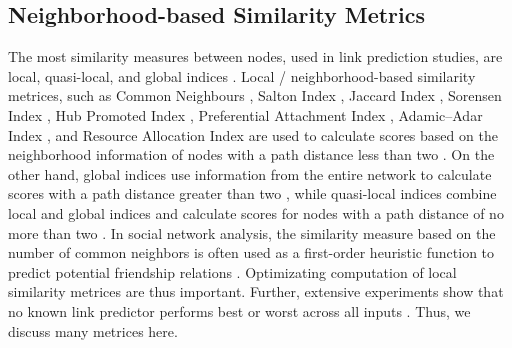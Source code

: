 



\subsection{Neighborhood-based Similarity Metrics}

The most similarity measures between nodes, used in link prediction studies, are local, quasi-local, and global indices \cite{arrar2023comprehensive}. Local / neighborhood-based similarity metrices, such as Common Neighbours \cite{newman2001clustering}, Salton Index \cite{salton1973specification}, Jaccard Index \cite{jaccard1901etude}, Sorensen Index \cite{sorensen1948method}, Hub Promoted Index \cite{liben2003link}, Preferential Attachment Index \cite{barabasi1999emergence}, Adamic–Adar Index \cite{adamic2003friends}, and Resource Allocation Index \cite{zhou2010solving} are used to calculate scores based on the neighborhood information of nodes with a path distance less than two \cite{arrar2023comprehensive}. On the other hand, global indices use information from the entire network to calculate scores with a path distance greater than two \cite{arrar2023comprehensive}, while quasi-local indices combine local and global indices and calculate scores for nodes with a path distance of no more than two \cite{arrar2023comprehensive}. In social network analysis, the similarity measure based on the number of common neighbors is often used as a first-order heuristic function to predict potential friendship relations \cite{arrar2023comprehensive}. Optimizating computation of local similarity metrices are thus important. Further, extensive experiments \cite{ghasemian2020stacking} show that no known link predictor performs best or worst across all inputs \cite{zhou2021progresses}. Thus, we discuss many metrices here.





